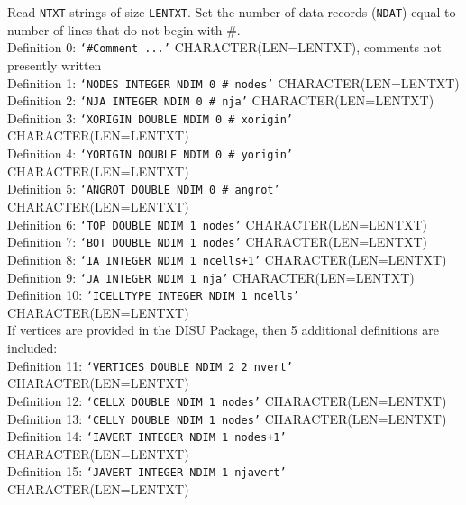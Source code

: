 \vspace{5mm}
\noindent Read \texttt{NTXT} strings of size \texttt{LENTXT}. Set the number of data records (\texttt{NDAT}) equal to number of lines that do not begin with \#.  \\
\noindent Definition 0: \texttt{`\#Comment ...'} {\color{red} \footnotesize{CHARACTER(LEN=LENTXT)}, comments not presently written} \\
\noindent Definition 1: \texttt{`NODES INTEGER NDIM 0 \# nodes'} {\color{red} \footnotesize{CHARACTER(LEN=LENTXT)}} \\
\noindent Definition 2: \texttt{`NJA INTEGER NDIM 0 \# nja'} {\color{red} \footnotesize{CHARACTER(LEN=LENTXT)}} \\
\noindent Definition 3: \texttt{`XORIGIN DOUBLE NDIM 0 \# xorigin'} {\color{red} \footnotesize{CHARACTER(LEN=LENTXT)}} \\
\noindent Definition 4: \texttt{`YORIGIN DOUBLE NDIM 0 \# yorigin'} {\color{red} \footnotesize{CHARACTER(LEN=LENTXT)}} \\
\noindent Definition 5: \texttt{`ANGROT DOUBLE NDIM 0 \# angrot'} {\color{red} \footnotesize{CHARACTER(LEN=LENTXT)}} \\
\noindent Definition 6: \texttt{`TOP DOUBLE NDIM 1 nodes'} {\color{red} \footnotesize{CHARACTER(LEN=LENTXT)}} \\
\noindent Definition 7: \texttt{`BOT DOUBLE NDIM 1 nodes'} {\color{red} \footnotesize{CHARACTER(LEN=LENTXT)}} \\
\noindent Definition 8: \texttt{`IA INTEGER NDIM 1 ncells+1'} {\color{red} \footnotesize{CHARACTER(LEN=LENTXT)}} \\
\noindent Definition 9: \texttt{`JA INTEGER NDIM 1 nja'} {\color{red} \footnotesize{CHARACTER(LEN=LENTXT)}} \\
\noindent Definition 10: \texttt{`ICELLTYPE INTEGER NDIM 1 ncells'} {\color{red} \footnotesize{CHARACTER(LEN=LENTXT)}} \\

\vspace{5mm}
\noindent If vertices are provided in the DISU Package, then 5 additional definitions are included: \\
\noindent Definition 11: \texttt{`VERTICES DOUBLE NDIM 2 2 nvert'} {\color{red} \footnotesize{CHARACTER(LEN=LENTXT)}} \\
\noindent Definition 12: \texttt{`CELLX DOUBLE NDIM 1 nodes'} {\color{red} \footnotesize{CHARACTER(LEN=LENTXT)}} \\
\noindent Definition 13: \texttt{`CELLY DOUBLE NDIM 1 nodes'} {\color{red} \footnotesize{CHARACTER(LEN=LENTXT)}} \\
\noindent Definition 14: \texttt{`IAVERT INTEGER NDIM 1 nodes+1'} {\color{red} \footnotesize{CHARACTER(LEN=LENTXT)}} \\
\noindent Definition 15: \texttt{`JAVERT INTEGER NDIM 1 njavert'} {\color{red} \footnotesize{CHARACTER(LEN=LENTXT)}} \\

